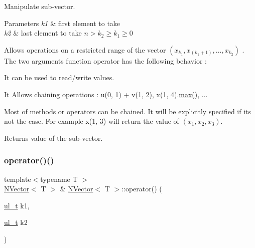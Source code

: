 Manipulate sub-\/vector. 


\begin{DoxyParams}{Parameters}
{\em k1} & first element to take \\
\hline
{\em k2} & last element to take $ n \gt k_2 \geq k_1 \geq 0 $\\
\hline
\end{DoxyParams}
Allows operations on a restricted range of the vector $ (x_{k_1}, x_{(k_1+1)}, ...,x_{k_2}) $ . The two arguments function operator has the following behavior \+:
\begin{DoxyItemize}
\item It can be used to read/write values.
\item It Allows chaining operations \+: {\ttfamily u(0, 1) + v(1, 2)}, {\ttfamily x(1, 4).\mbox{\hyperlink{class_n_vector_afc7553743872ccb71e902a154eb60dc2}{max()}}}, ...
\end{DoxyItemize}

Most of methods or operators can be chained. It will be explicitly specified if it\textquotesingle{}s not the case. For example {\ttfamily x(1, 3)} will return the value of $ (x_1, x_2, x_3) $.

\begin{DoxyReturn}{Returns}
value of the sub-\/vector. 
\end{DoxyReturn}
\mbox{\label{class_n_vector_a98f95a46c34ceaf355e86e9dad9863e1}} 
\subsubsection{\texorpdfstring{operator()()}{operator()()}\hspace{0.1cm}{\footnotesize\ttfamily [4/4]}}
{\footnotesize\ttfamily template$<$typename T $>$ \\
\mbox{\hyperlink{class_n_vector}{N\+Vector}}$<$ T $>$ \& \mbox{\hyperlink{class_n_vector}{N\+Vector}}$<$ T $>$\+::operator() (\begin{DoxyParamCaption}\item[{\mbox{\hyperlink{group___n_algebra_ga1b140a2034db3f5dfe18a987745df43a}{ul\+\_\+t}}}]{k1,  }\item[{\mbox{\hyperlink{group___n_algebra_ga1b140a2034db3f5dfe18a987745df43a}{ul\+\_\+t}}}]{k2 }\end{DoxyParamCaption})}



